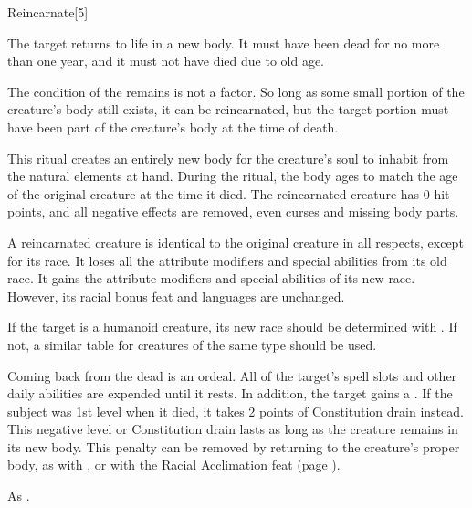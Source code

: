 \begin{spellsection}{Reincarnate}[5]
    \begin{spellheader}
    \end{spellheader}
    \begin{spellcontent}
        \begin{spelltargetinginfo}
        \end{spelltargetinginfo}
        \begin{spelleffects}

            \spelleffect The target returns to life in a new body. It must have been dead for no more than one year, and it must not have died due to old age.

            The condition of the remains is not a factor. So long as some small portion of the creature's body still exists, it can be reincarnated, but the target portion must have been part of the creature's body at the time of death.

            This ritual creates an entirely new body for the creature's soul to inhabit from the natural elements at hand. During the ritual, the body ages to match the age of the original creature at the time it died. The reincarnated creature has 0 hit points, and all negative effects are removed, even curses and missing body parts.

            A reincarnated creature is identical to the original creature in all respects, except for its race. It loses all the attribute modifiers and special abilities from its old race. It gains the attribute modifiers and special abilities of its new race. However, its racial bonus feat and languages are unchanged.

            If the target is a humanoid creature, its new race should be determined with . If not, a similar table for creatures of the same type should be used.

            Coming back from the dead is an ordeal. All of the target's spell slots and other daily abilities are expended until it rests. In addition, the target gains a \negativelevel. If the subject was 1st level when it died, it takes 2 points of Constitution drain instead. This negative level or Constitution drain lasts as long as the creature remains in its new body. This penalty can be removed by returning to the creature's proper body, as with , or with the Racial Acclimation feat (page ).

        \end{spelleffects}
    \end{spellcontent}
    \begin{spellfooter}
        \spellnotes As .
    \end{spellfooter}
\end{spellsection}
